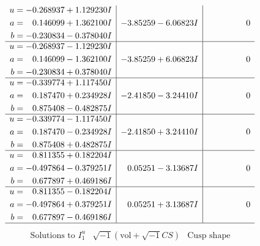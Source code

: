 \documentclass[1p]{elsarticle_modified}
\theoremstyle{definition}
\newcommand{\I}{\sqrt{-1}}
\begin{document}
$$\begin{array}{c|c|c}
\begin{aligned}
u &= -0.268937 + 1.129230 I \\
a &= \phantom{-}0.146099 + 1.362100 I \\
b &= -0.230834 - 0.378040 I\end{aligned}
 & -3.85259 - 6.06823 I & \phantom{-0.000000 } 0 \\ \hline\begin{aligned}
u &= -0.268937 - 1.129230 I \\
a &= \phantom{-}0.146099 - 1.362100 I \\
b &= -0.230834 + 0.378040 I\end{aligned}
 & -3.85259 + 6.06823 I & \phantom{-0.000000 } 0 \\ \hline\begin{aligned}
u &= -0.339774 + 1.117450 I \\
a &= \phantom{-}0.187470 + 0.234928 I \\
b &= \phantom{-}0.875408 - 0.482875 I\end{aligned}
 & -2.41850 - 3.24410 I & \phantom{-0.000000 } 0 \\ \hline\begin{aligned}
u &= -0.339774 - 1.117450 I \\
a &= \phantom{-}0.187470 - 0.234928 I \\
b &= \phantom{-}0.875408 + 0.482875 I\end{aligned}
 & -2.41850 + 3.24410 I & \phantom{-0.000000 } 0 \\ \hline\begin{aligned}
u &= \phantom{-}0.811355 + 0.182204 I \\
a &= -0.497864 - 0.379251 I \\
b &= \phantom{-}0.677897 + 0.469186 I\end{aligned}
 & \phantom{-}0.05251 - 3.13687 I & \phantom{-0.000000 } 0 \\ \hline\begin{aligned}
u &= \phantom{-}0.811355 - 0.182204 I \\
a &= -0.497864 + 0.379251 I \\
b &= \phantom{-}0.677897 - 0.469186 I\end{aligned}
 & \phantom{-}0.05251 + 3.13687 I & \phantom{-0.000000 } 0\\
 \hline 
 \end{array}$$\newpage$$\begin{array}{c|c|c}  
\text{Solutions to }I^u_{1}& \I (\text{vol} + \sqrt{-1}CS) & \text{Cusp shape}\\
 \hline 
\begin{aligned}

\end{aligned}
\end{array}$$
\end{document}
